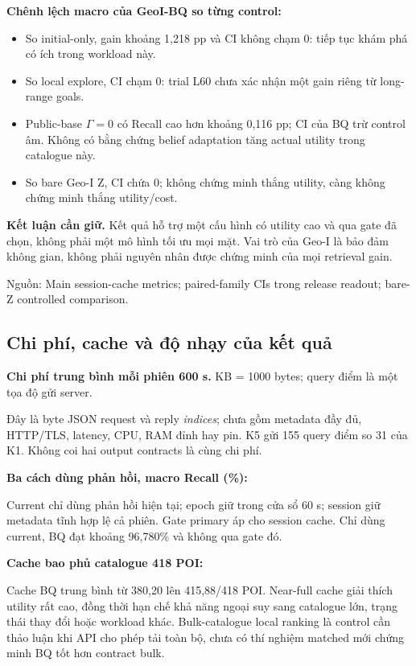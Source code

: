 \documentclass[10pt,a4paper]{article}
\newcommand{\source}[1]{\par{\footnotesize\color{gray}Nguồn: #1}\par}
\newcommand{\claim}[1]{\par\textbf{Kết luận cần giữ.} #1\par}
\begin{document}
\textbf{Chênh lệch macro của GeoI-BQ so từng control:}
\begin{small}\end{small}
\begin{itemize}
\item So initial-only, gain khoảng 1,218 pp và CI không chạm 0: tiếp tục khám phá có ích trong workload này.
\item So local explore, CI chạm 0: trial L60 chưa xác nhận một gain riêng từ long-range goals.
\item Public-base $\Gamma=0$ có Recall cao hơn khoảng 0,116 pp; CI của BQ trừ control âm.
Không có bằng chứng belief adaptation tăng actual utility trong catalogue này.
\item So bare Geo-I Z, CI chứa 0; không chứng minh thắng utility, càng không chứng minh thắng utility/cost.
\end{itemize}

\claim{Kết quả hỗ trợ một cấu hình có utility cao và qua gate đã chọn, không phải một mô hình tối ưu mọi mặt. Vai trò của Geo-I là bảo đảm không gian, không phải nguyên nhân được chứng minh của mọi retrieval gain.}
\source{Main session-cache metrics; paired-family CIs trong release readout; bare-Z controlled comparison.}

\clearpage
\subsection{Chi phí, cache và độ nhạy của kết quả}
\textbf{Chi phí trung bình mỗi phiên 600 s.} KB = 1000 bytes; query điểm là một tọa độ gửi server.
\begin{small}\end{small}
Đây là byte JSON request và reply \emph{indices}; chưa gồm metadata đầy đủ, HTTP/TLS, latency, CPU, RAM đỉnh hay pin.
K5 gửi 155 query điểm so 31 của K1. Không coi hai output contracts là cùng chi phí.

\textbf{Ba cách dùng phản hồi, macro Recall (\%):}
\begin{small}\end{small}
Current chỉ dùng phản hồi hiện tại; epoch giữ trong cửa sổ 60 s; session giữ metadata tĩnh hợp lệ cả phiên.
Gate primary áp cho session cache. Chỉ dùng current, BQ đạt khoảng 96,780\% và không qua gate đó.

\textbf{Cache bao phủ catalogue 418 POI:}
\begin{small}\end{small}
Cache BQ trung bình từ 380,20 lên 415,88/418 POI. Near-full cache giải thích utility rất cao, đồng thời hạn chế
khả năng ngoại suy sang catalogue lớn, trạng thái thay đổi hoặc workload khác. Bulk-catalogue local ranking là control
cần thảo luận khi API cho phép tải toàn bộ, chưa có thí nghiệm matched mới chứng minh BQ tốt hơn contract bulk.
\end{document}
